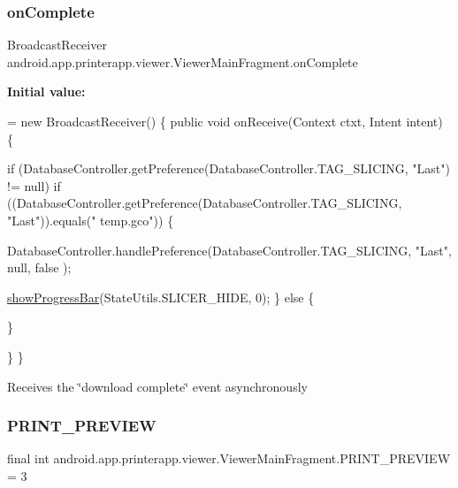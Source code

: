 \subsubsection{\texorpdfstring{on\+Complete}{onComplete}}
{\footnotesize\ttfamily Broadcast\+Receiver android.\+app.\+printerapp.\+viewer.\+Viewer\+Main\+Fragment.\+on\+Complete}

{\bfseries Initial value\+:}
\begin{DoxyCode}
= \textcolor{keyword}{new} BroadcastReceiver() \{
        \textcolor{keyword}{public} \textcolor{keywordtype}{void} onReceive(Context ctxt, Intent intent) \{

            \textcolor{keywordflow}{if} (DatabaseController.getPreference(DatabaseController.TAG\_SLICING, \textcolor{stringliteral}{"Last"}) != null)
                \textcolor{keywordflow}{if} ((DatabaseController.getPreference(DatabaseController.TAG\_SLICING, \textcolor{stringliteral}{"Last"})).equals(\textcolor{stringliteral}{"
      temp.gco"})) \{

                    DatabaseController.handlePreference(DatabaseController.TAG\_SLICING, \textcolor{stringliteral}{"Last"}, null, \textcolor{keyword}{false}
      );


                    \hyperlink{classandroid_1_1app_1_1printerapp_1_1viewer_1_1_viewer_main_fragment_a52f16ff69f6d64fb40c309f0df7eb734}{showProgressBar}(StateUtils.SLICER\_HIDE, 0);
                \} \textcolor{keywordflow}{else} \{

                \}


        \}
    \}
\end{DoxyCode}
Receives the \char`\"{}download complete\char`\"{} event asynchronously \mbox{\label{classandroid_1_1app_1_1printerapp_1_1viewer_1_1_viewer_main_fragment_a35fadb136145b0c1ab453cf6335e57e3}} 
\subsubsection{\texorpdfstring{P\+R\+I\+N\+T\+\_\+\+P\+R\+E\+V\+I\+EW}{PRINT\_PREVIEW}}
{\footnotesize\ttfamily final int android.\+app.\+printerapp.\+viewer.\+Viewer\+Main\+Fragment.\+P\+R\+I\+N\+T\+\_\+\+P\+R\+E\+V\+I\+EW = 3\hspace{0.3cm}{\ttfamily [static]}}

